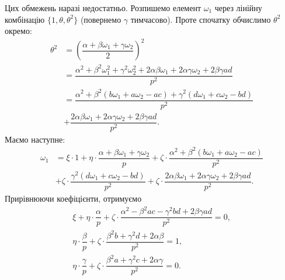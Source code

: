 \documentclass{thesis}
\begin{document}
Цих обмежень наразі недостатньо. Розпишемо елемент $\omega_1$ через лінійну комбінацію $\{1,\theta,\theta^2\}$ (повернемо $\gamma$ тимчасово). Проте спочатку обчислимо $\theta^2$ окремо:
\begin{align*}
\theta^2 & = \left( \dfrac{\alpha + \beta \omega_1 + \gamma \omega_2}{2} \right)^2 \\
& = \dfrac{\alpha^2 + \beta^2 \omega_1^2 + \gamma^2 \omega_2^2 + 2 \alpha \beta \omega_1 + 2\alpha \gamma \omega_2 + 2 \beta \gamma ad}{p^2} \\
& = \dfrac{\alpha^2 + \beta^2 (b\omega_1 + a \omega_2 - ac) + \gamma^2 (d \omega_1 + c \omega_2 - bd)}{p^2} \\ & + \dfrac{2\alpha \beta \omega_1 + 2 \alpha \gamma \omega_2 + 2 \beta \gamma ad}{p^2}.
\end{align*}
Маємо наступне:
\begin{align*}
\omega_1 & = \xi \cdot 1 + \eta \cdot \dfrac{\alpha + \beta \omega_1 + \gamma \omega_2}{p} + \zeta \cdot \dfrac{\alpha^2 + \beta^2(b\omega_1+a\omega_2-ac)}{p^2} \\
& + \zeta \cdot \dfrac{\gamma^2 (d \omega_1 + c \omega_2 - bd)}{p^2} + \zeta \cdot \dfrac{2\alpha \beta \omega_1 + 2 \alpha \gamma \omega_2 + 2 \beta \gamma ad}{p^2}.
\end{align*}
Прирівнюючи коефіцієнти, отримуємо
\begin{align*}
\xi + \eta \cdot \dfrac{\alpha}{p} + \zeta \cdot \dfrac{\alpha^2 - \beta^2 ac - \gamma^2 bd + 2 \beta \gamma ad}{p^2} = 0,\\
\eta \cdot \dfrac{\beta}{p} + \zeta \cdot \dfrac{\beta^2 b + \gamma^2 d + 2\alpha\beta}{p^2} = 1,\\
\eta \cdot \dfrac{\gamma}{p} + \zeta \cdot \dfrac{\beta^2 a + \gamma^2 c + 2 \alpha \gamma}{p^2} = 0.
\end{align*}

\end{document}
